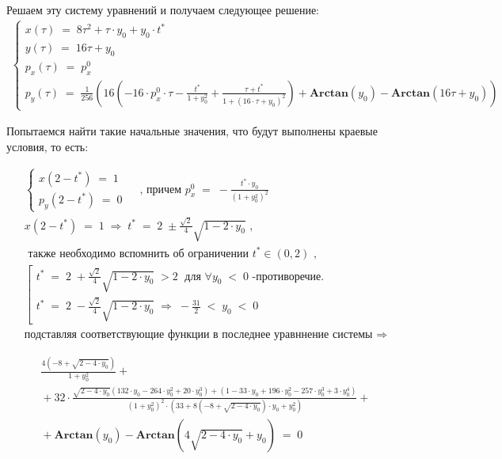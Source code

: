 \documentclass[a4paper,12pt]{article}
\begin{document}
Решаем эту систему уравнений и получаем следующее решение:
\begin{align*}
    \left\{
        \begin{array}{l}
            x(\tau)\;=\; 8 {\tau}^{2}+\tau \cdot y_0 + y_0 \cdot t^*\\
            y(\tau)\;=\; 16 \tau + y_0\\
            p_x(\tau)\;=\; p_x^0\\
            p_y(\tau)\;=\; \frac{1}{256}\left(
                16 \left(
                    -16\cdot p_x^0 \cdot \tau - \frac{t^*}{1+y_0^2} + \frac{\tau + t^*}{1+(16 \cdot \tau + y_0)^2}
                \right)+
                \mathbf{Arctan}(y_0)-
                \mathbf{Arctan}(16 \tau + y_0)
            \right)
        \end{array}
    \right.
\end{align*}

Попытаемся найти такие начальные значения, что будут выполнены краевые условия, то есть:

\begin{align*}
    \left\{
        \begin{array}{l}
            x(2-t^*)\;=\;1 \\
            p_y(2-t^*)\;=\;0
        \end{array}
    \right.
    \;\;\;\text{ , причем } p_x^0 \;=\; -\frac{t^* \cdot y_0}{(1+y_0^2)^2}
    \\
    x(2-t^*)\;=\;1\; \Rightarrow \; t^*\;=\;2\;\pm \frac{\sqrt{2}}{4}\sqrt{1-2\cdot y_0}\text{ , }
    \\
    \text{ также необходимо вспомнить об ограничении }t^*\in\left(0,2\right)\text{ ,}
    \\
    \left[
    \begin{array}{l}
        t^*\;=\;2\;+ \frac{\sqrt{2}}{4}\sqrt{1-2\cdot y_0}\;>2\;\text{ для }\forall y_0\;<\;0\text{ -противоречие.}
        \\
        t^*\;=\;2\;- \frac{\sqrt{2}}{4}\sqrt{1-2\cdot y_0}\;\Rightarrow\; -\frac{31}{2}\;<\;y_0\;<\;0
    \end{array}
    \right.
    \\
    \text{подставляя соответствующие функции в последнее уравннение системы }\Rightarrow 
\end{align*}

\begin{multline*}
    \frac{4(-8+\sqrt{2-4\cdot y_0})}{1+y_0^2}+{}\\
    {}+32 \cdot \frac{\sqrt{2-4\cdot y_0}(132\cdot y_0-264\cdot y_0^2+20\cdot y_0^3)+(1-33\cdot y_0+196\cdot y_0^2-257\cdot y_0^3+3\cdot y_0^4)}{(1+y_0^2)^2\cdot (33+8(-8+\sqrt{2-4 \cdot y_0})\cdot y_0 +y_0^2)}+{}\\
    {}+\mathbf{Arctan}(y_0)-
    \mathbf{Arctan}(4\sqrt{2-4\cdot y_0}+ y_0)\;=\; 0
\end{multline*}
\end{document}
